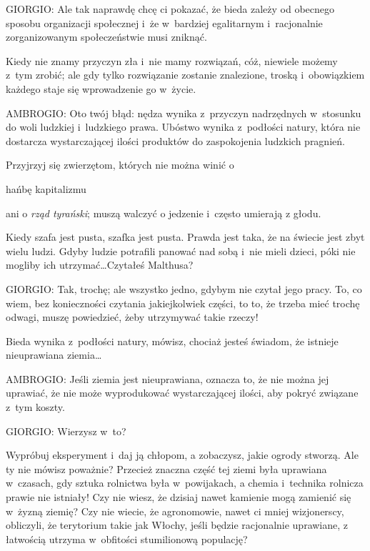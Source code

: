 \documentclass[oneside,polish,11pt,sfheadings]{mwbk}
\begin{document}
 
\noindent GIORGIO: Ale tak naprawdę chcę ci pokazać, że bieda zależy od obecnego sposobu organizacji społecznej i~że w~bardziej
egalitarnym i~racjonalnie zorganizowanym społeczeństwie musi zniknąć. 

 
Kiedy nie znamy przyczyn zła i~nie mamy rozwiązań, cóż, niewiele możemy z~tym zrobić; ale gdy tylko rozwiązanie zostanie
znalezione, troską i~obowiązkiem każdego staje się wprowadzenie go w~życie. 




 
\noindent AMBROGIO: Oto twój błąd: nędza wynika z~przyczyn nadrzędnych w~stosunku do woli ludzkiej i~ludzkiego prawa. Ubóstwo
wynika z~podłości natury, która nie dostarcza wystarczającej ilości produktów do zaspokojenia ludzkich pragnień. 

 
Przyjrzyj się zwierzętom, których nie można winić o \begin{itshape}hańbę
kapitalizmu \end{itshape} ani o \textit{rząd tyrański}; muszą walczyć o jedzenie i~często umierają
z głodu. 

 
Kiedy szafa jest pusta, szafka jest pusta. Prawda jest taka, że  na świecie jest zbyt wielu ludzi. Gdyby
ludzie potrafili panować nad sobą i~nie mieli dzieci, póki nie mogliby ich utrzymać\ldots Czytałeś Malthusa? 




 
\noindent GIORGIO: Tak, trochę; ale wszystko jedno, gdybym nie czytał jego pracy. To, co wiem, bez konieczności czytania
jakiejkolwiek części, to to, że trzeba mieć trochę odwagi, muszę powiedzieć, żeby utrzymywać takie rzeczy! 

 
Bieda wynika z~podłości natury, mówisz, chociaż jesteś świadom, że istnieje nieuprawiana ziemia\ldots 




 
\noindent AMBROGIO: Jeśli ziemia jest nieuprawiana, oznacza to, że nie można jej uprawiać, że nie może wyprodukować wystarczającej
ilości, aby pokryć związane z~tym koszty. 




 
\noindent GIORGIO: Wierzysz w~to? 

 
Wypróbuj eksperyment i~daj ją chłopom, a zobaczysz, jakie ogrody stworzą. Ale ty nie mówisz poważnie? Przecież znaczna
część tej ziemi była uprawiana w~czasach, gdy sztuka rolnictwa była w~powijakach, a chemia i~technika rolnicza prawie
nie istniały! Czy nie wiesz, że dzisiaj nawet kamienie mogą zamienić się w~żyzną ziemię? Czy nie wiecie, że
agronomowie, nawet ci mniej wizjonerscy, obliczyli, że terytorium takie jak Włochy, jeśli będzie racjonalnie uprawiane,
z łatwością utrzyma w~obfitości stumilionową populację? 
\end{document}
